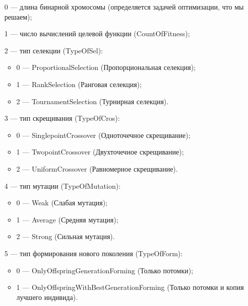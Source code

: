 \documentclass[a4paper,12pt]{article}
\begin{document}
 \begin{itemize}
 \item [0] --- длина бинарной хромосомы (определяется задачей оптимизации, что мы решаем);
 
 \item [1] --- число вычислений целевой функции (CountOfFitness);
 
 \item [2] --- тип селекции (TypeOfSel):
 
 \begin{itemize}
       \item 0 --- ProportionalSelection (Пропорциональная селекция);
 
       \item 1 --- RankSelection (Ранговая селекция);
 
       \item 2 --- TournamentSelection (Турнирная селекция).
	    \end{itemize}
 
 \item [3] --- тип скрещивания (TypeOfCros):
  \begin{itemize}
       \item 0 --- SinglepointCrossover (Одноточечное скрещивание);
 
       \item 1 --- TwopointCrossover (Двухточечное скрещивание);
 
       \item 2 --- UniformCrossover (Равномерное скрещивание).
	    \end{itemize}
 
 \item [4] --- тип мутации (TypeOfMutation):
  \begin{itemize}
       \item 0 --- Weak (Слабая мутация);
 
       \item 1 --- Average (Средняя мутация);
 
       \item 2 --- Strong (Сильная мутация).
	    \end{itemize}
 
 \item [5] --- тип формирования нового поколения (TypeOfForm):
  \begin{itemize}
       \item 0 --- OnlyOffspringGenerationForming (Только потомки);
 
       \item 1 --- OnlyOffspringWithBestGenerationForming (Только потомки и копия лучшего индивида).
	    \end{itemize}
		

\end{itemize}
\end{document}
